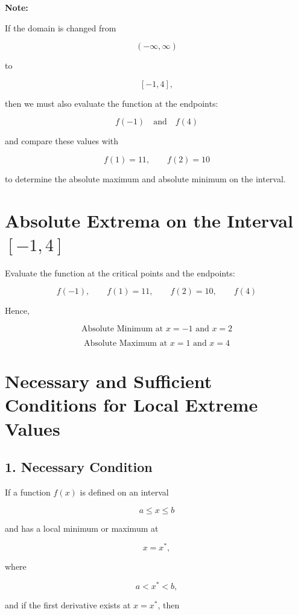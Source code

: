\documentclass{article}
\begin{document}
\vspace{1cm}

\textbf{Note:}

If the domain is changed from

\[
(-\infty,\infty)
\]

to

\[
[-1,4],
\]

then we must also evaluate the function at the endpoints:

\[
f(-1)\quad\text{and}\quad f(4)
\]

and compare these values with

\[
f(1)=11,\qquad f(2)=10
\]

to determine the absolute maximum and absolute minimum on the interval.


\section*{Absolute Extrema on the Interval \texorpdfstring{$[-1,4]$}{[-1,4]}}

Evaluate the function at the critical points and the endpoints:

\[
f(-1), \qquad f(1)=11, \qquad f(2)=10, \qquad f(4)
\]

Hence,

\[
\boxed{\text{Absolute Minimum at }x=-1 \text{ and }x=2}
\]

\[
\boxed{\text{Absolute Maximum at }x=1 \text{ and }x=4}
\]

\vspace{0.5cm}

\section*{Necessary and Sufficient Conditions for Local Extreme Values}

\subsection*{1. Necessary Condition}

If a function $f(x)$ is defined on an interval

\[
a \le x \le b
\]

and has a local minimum or maximum at

\[
x=x^*,
\]

where

\[
a<x^*<b,
\]

and if the first derivative exists at $x=x^*$, then
\end{document}
